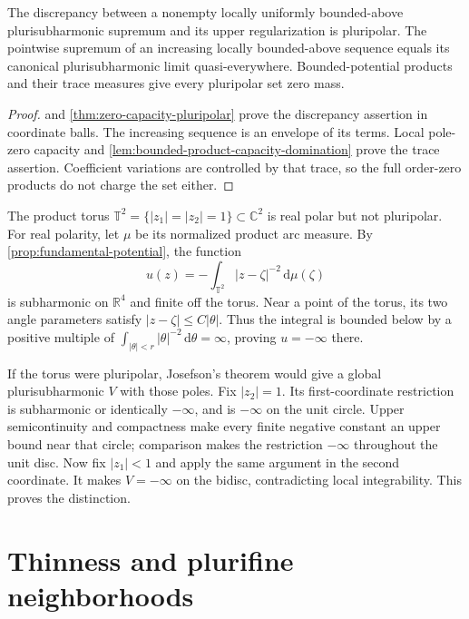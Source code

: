 \begin{corollary}\label{cor:psh-pluripolar-discrepancy}
The discrepancy between a nonempty locally uniformly bounded-above plurisubharmonic supremum and its upper regularization is pluripolar. The pointwise supremum of an increasing locally bounded-above sequence equals its canonical plurisubharmonic limit quasi-everywhere. Bounded-potential products and their trace measures give every pluripolar set zero mass.
\end{corollary}
\begin{proof}
 and \cref{thm:zero-capacity-pluripolar} prove the discrepancy assertion in coordinate balls. The increasing sequence is an envelope of its terms. Local pole-zero capacity and \cref{lem:bounded-product-capacity-domination} prove the trace assertion. Coefficient variations are controlled by that trace, so the full order-zero products do not charge the set either.
\end{proof}

\begin{example}\label{ex:real-polar-not-pluripolar}
The product torus $\mathbb T^2=\{|z_1|=|z_2|=1\}\subset\mathbb C^2$ is real polar but not pluripolar. For real polarity, let $\mu$ be its normalized product arc measure. By \cref{prop:fundamental-potential}, the function
\[
 u(z)=-\int_{\mathbb T^2}|z-\zeta|^{-2}\,\mathrm d\mu(\zeta)
\]
is subharmonic on $\mathbb R^4$ and finite off the torus. Near a point of the torus, its two angle parameters satisfy $|z-\zeta|\le C|\theta|$. Thus the integral is bounded below by a positive multiple of $\int_{|\theta|<r}|\theta|^{-2}\,\mathrm d\theta=\infty$, proving $u=-\infty$ there.

If the torus were pluripolar, Josefson's theorem would give a global plurisubharmonic $V$ with those poles. Fix $|z_2|=1$. Its first-coordinate restriction is subharmonic or identically $-\infty$, and is $-\infty$ on the unit circle. Upper semicontinuity and compactness make every finite negative constant an upper bound near that circle; comparison makes the restriction $-\infty$ throughout the unit disc. Now fix $|z_1|<1$ and apply the same argument in the second coordinate. It makes $V=-\infty$ on the bidisc, contradicting local integrability. This proves the distinction.
\end{example}

\section{Thinness and plurifine neighborhoods}
\label{sec:plurifine-neighborhoods}

